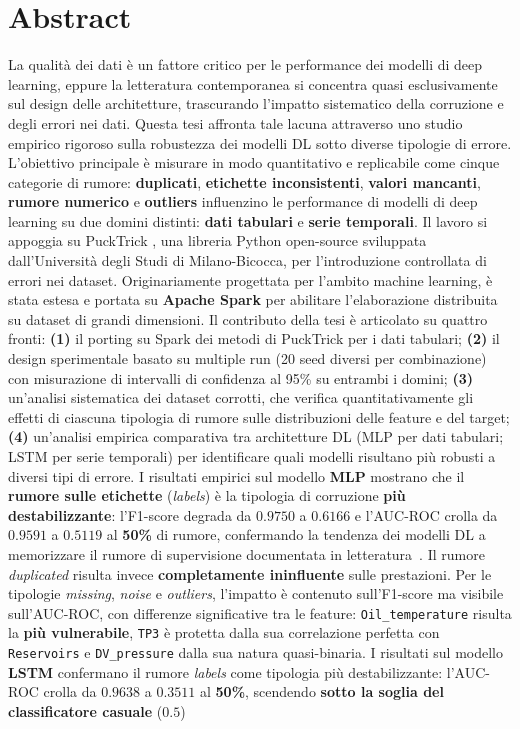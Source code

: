 \documentclass[../main.tex]{subfiles}
\begin{document}
\chapter*{Abstract}
\label{chap:Abstract}

La qualità dei dati è un fattore critico per le performance dei modelli di deep learning, eppure la letteratura contemporanea si concentra quasi esclusivamente sul design delle architetture, trascurando l'impatto sistematico della corruzione e degli errori nei dati. Questa tesi affronta tale lacuna attraverso uno studio empirico rigoroso sulla robustezza dei modelli DL sotto diverse tipologie di errore. L'obiettivo principale è misurare in modo quantitativo e replicabile come cinque categorie di rumore: \textbf{duplicati}, \textbf{etichette inconsistenti}, \textbf{valori mancanti}, \textbf{rumore numerico} e \textbf{outliers} influenzino le performance di modelli di deep learning su due domini distinti: \textbf{dati tabulari} e \textbf{serie temporali}. Il lavoro si appoggia su PuckTrick \cite{agostini2025pucktricklibrarymakingsynthetic}, una libreria Python open-source sviluppata dall'Università degli Studi di Milano-Bicocca, per l'introduzione controllata di errori nei dataset. Originariamente progettata per l'ambito machine learning, è stata estesa e portata su \textbf{Apache Spark} per abilitare l'elaborazione distribuita su dataset di grandi dimensioni. Il contributo della tesi è articolato su quattro fronti: \textbf{(1)} il porting su Spark dei metodi di PuckTrick per i dati tabulari; \textbf{(2)} il design sperimentale basato su multiple run (20 seed diversi per combinazione) con misurazione di intervalli di confidenza al 95\% su entrambi i domini; \textbf{(3)} un'analisi sistematica dei dataset corrotti, che verifica quantitativamente gli effetti di ciascuna tipologia di rumore sulle distribuzioni delle feature e del target; \textbf{(4)} un'analisi empirica comparativa tra architetture DL (MLP per dati tabulari; LSTM per serie temporali) per identificare quali modelli risultano più robusti a diversi tipi di errore. I risultati empirici sul modello \textbf{MLP} mostrano che il \textbf{rumore sulle etichette} (\textit{labels}) è la tipologia di corruzione \textbf{più destabilizzante}: l'F1-score degrada da $\mathbf{0.9750}$ a $\mathbf{0.6166}$ e l'AUC-ROC crolla da $\mathbf{0.9591}$ a $\mathbf{0.5119}$ al \textbf{50\%} di rumore, confermando la tendenza dei modelli DL a memorizzare il rumore di supervisione documentata in letteratura~\cite{zhang2017understandingdeeplearningrequires}. Il rumore \textit{duplicated} risulta invece \textbf{completamente ininfluente} sulle prestazioni. Per le tipologie \textit{missing}, \textit{noise} e \textit{outliers}, l'impatto è contenuto sull'F1-score ma visibile sull'AUC-ROC, con differenze significative tra le feature: \texttt{Oil\_temperature} risulta la \textbf{più vulnerabile}, \texttt{TP3} è protetta dalla sua correlazione perfetta con \texttt{Reservoirs} e \texttt{DV\_pressure} dalla sua natura quasi-binaria. I risultati sul modello \textbf{LSTM} confermano il rumore \textit{labels} come tipologia più destabilizzante: l'AUC-ROC crolla da $\mathbf{0.9638}$ a $\mathbf{0.3511}$ al \textbf{50\%}, scendendo \textbf{sotto la soglia del classificatore casuale} ($0.5$) 
\end{document}

